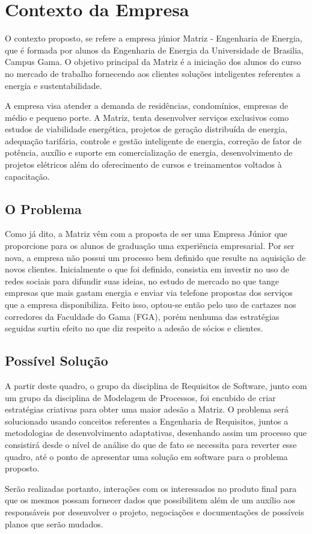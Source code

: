 \chapter[Contexto da Empresa]{Contexto da Empresa}
O contexto proposto, se refere a empresa júnior Matriz - Engenharia de Energia, que é 
formada por alunos da Engenharia de Energia da Universidade de Brasilia, Campus Gama. 
O objetivo principal da Matriz é a iniciação dos alunos do curso no mercado de trabalho 
fornecendo aos clientes soluções inteligentes referentes a energia e sustentabilidade.

A empresa visa atender a demanda de residências, condomínios, empresas de médio 
e pequeno porte. A Matriz, tenta desenvolver serviços exclusivos como estudos de
viabilidade energética, projetos de geração distribuída de energia, adequação tarifária, 
controle e gestão inteligente de energia, correção de fator de potência, auxílio e suporte
em comercialização de energia, desenvolvimento de projetos elétricos além do oferecimento 
de cursos e treinamentos voltados à capacitação.

\section{O Problema}
Como já dito, a Matriz vêm com a proposta de ser uma Empresa Júnior que proporcione para 
os alunos de graduação uma experiência empresarial. Por ser nova, a empresa não possui 
um processo bem definido que resulte na aquisição de novos clientes. Inicialmente o que 
foi definido, consistia em investir no uso de redes sociais para difundir suas ideias, 
no estudo de mercado no que tange empresas que mais gastam energia e enviar via telefone
propostas dos serviços que a empresa disponibiliza. Feito isso, optou-se então pelo uso de
cartazes nos corredores da Faculdade do Gama (FGA), porém nenhuma das estratégias seguidas
surtiu efeito no que diz respeito a adesão de sócios e clientes.

\section{Possível Solução}
A partir deste quadro, o grupo da disciplina de Requisitos de Software, junto com um 
grupo da disciplina de Modelagem de Processos, foi encubido de criar estratégias 
criativas para obter uma maior adesão a Matriz. O problema será solucionado 
usando conceitos referentes a Engenharia de Requisitos, juntos a metodologias de 
desenvolvimento adaptativas, desenhando assim um processo que consistirá desde o nível 
de análise do que de fato se necessita para reverter esse quadro, até o ponto de 
apresentar uma solução em software para o problema proposto.

Serão realizadas portanto, interações com os interessados no produto final para que 
os mesmos possam fornecer dados que possibilitem além de um auxílio aos responsáveis 
por desenvolver o projeto, negociações e documentações de possíveis planos que serão
mudados.
